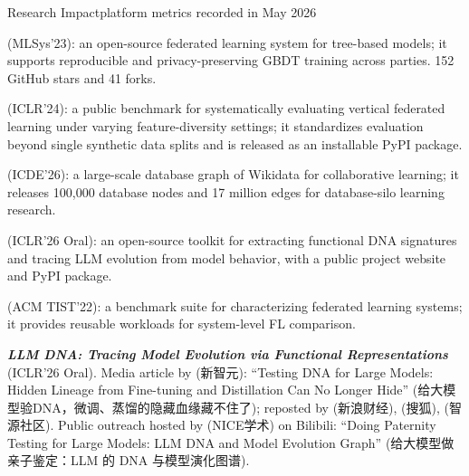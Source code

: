 \begin{rSectionTiny}{Research Impact}{platform metrics recorded in May 2026}
  {\small
    \begin{list}{\textbullet}{\setlength{\leftmargin}{1.2em}\setlength{\labelwidth}{0.7em}\setlength{\labelsep}{0.35em}\setlength{\itemsep}{0.12em}\setlength{\parsep}{0pt}\setlength{\topsep}{0.1em}}
      \item \textbf{} (MLSys'23): an open-source federated learning system for tree-based models; it supports reproducible and privacy-preserving GBDT training across parties. 152 GitHub stars and 41 forks.
      \item \textbf{} (ICLR'24): a public benchmark for systematically evaluating vertical federated learning under varying feature-diversity settings; it standardizes evaluation beyond single synthetic data splits and is released as an installable PyPI package.
      \item \textbf{} (ICDE'26): a large-scale database graph of Wikidata for collaborative learning; it releases 100{,}000 database nodes and 17 million edges for database-silo learning research.
      \item \textbf{} (ICLR'26 Oral): an open-source toolkit for extracting functional DNA signatures and tracing LLM evolution from model behavior, with a public project website and PyPI package.
      \item \textbf{} (ACM TIST'22): a benchmark suite for characterizing federated learning systems; it provides reusable workloads for system-level FL comparison.
    \end{list}

    \noindent \textbf{\textit{LLM DNA: Tracing Model Evolution via Functional Representations}} (ICLR'26 Oral). Media article by  (新智元): ``Testing DNA for Large Models: Hidden Lineage from Fine-tuning and Distillation Can No Longer Hide'' (给大模型验DNA，微调、蒸馏的隐藏血缘藏不住了); reposted by  (新浪财经),  (搜狐),  (智源社区). Public outreach hosted by  (NICE学术) on Bilibili: ``Doing Paternity Testing for Large Models: LLM DNA and Model Evolution Graph'' (给大模型做亲子鉴定：LLM 的 DNA 与模型演化图谱).\par\vspace{0.1em}

}
\end{rSectionTiny}
